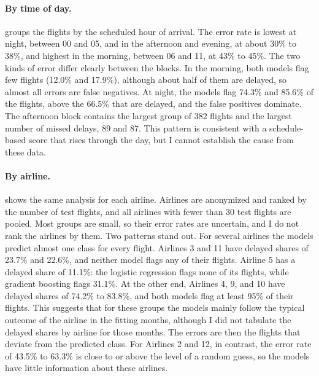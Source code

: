\paragraph{By time of day.}  groups the flights by the scheduled hour of arrival. The error rate is lowest at night, between 00 and 05, and in the afternoon and evening, at about 30\% to 38\%, and highest in the morning, between 06 and 11, at 43\% to 45\%. The two kinds of error differ clearly between the blocks. In the morning, both models flag few flights (12.0\% and 17.9\%), although about half of them are delayed, so almost all errors are false negatives. At night, the models flag 74.3\% and 85.6\% of the flights, above the 66.5\% that are delayed, and the false positives dominate. The afternoon block contains the largest group of 382 flights and the largest number of missed delays, 89 and 87. This pattern is consistent with a schedule-based score that rises through the day, but I cannot establish the cause from these data.



\paragraph{By airline.}  shows the same analysis for each airline. Airlines are anonymized and ranked by the number of test flights, and all airlines with fewer than 30 test flights are pooled. Most groups are small, so their error rates are uncertain, and I do not rank the airlines by them. Two patterns stand out. For several airlines the models predict almost one class for every flight. Airlines 3 and 11 have delayed shares of 23.7\% and 22.6\%, and neither model flags any of their flights. Airline 5 has a delayed share of 11.1\%: the logistic regression flags none of its flights, while gradient boosting flags 31.1\%. At the other end, Airlines 4, 9, and 10 have delayed shares of 74.2\% to 83.8\%, and both models flag at least 95\% of their flights. This suggests that for these groups the models mainly follow the typical outcome of the airline in the fitting months, although I did not tabulate the delayed shares by airline for those months. The errors are then the flights that deviate from the predicted class. For Airlines 2 and 12, in contrast, the error rate of 43.5\% to 63.3\% is close to or above the level of a random guess, so the models have little information about these airlines.



